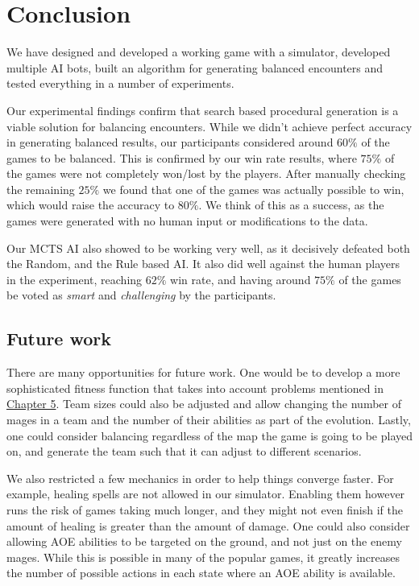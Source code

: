 \chapter{Conclusion}
\label{chapter06}

We have designed and developed a working game with a simulator, developed multiple
AI bots, built an algorithm for generating balanced encounters and tested everything
in a number of experiments.

Our experimental findings confirm that search based procedural generation
is a viable solution for balancing encounters. While we didn't achieve perfect
accuracy in generating balanced results, our participants considered around $60\%$
of the games to be balanced. This is confirmed by our win rate results, where $75\%$
of the games were not completely won/lost by the players. After manually checking the remaining
$25\%$ we found that one of the games was actually possible to win, which would raise the accuracy
to $80\%$. We think of this as a success, as the games were generated with no human input or modifications to the data.

Our MCTS AI also showed to be working very well, as it decisively defeated both the Random, and the Rule based AI.
It also did well against the human players in the experiment, reaching $62\%$ win rate, and having around $75\%$ of the
games be voted as \emph{smart} and \emph{challenging} by the participants.

\section{Future work}

There are many opportunities for future work. One would be to develop a more sophisticated fitness function that
takes into account problems mentioned in \hyperref[chapter05]{Chapter 5}. Team sizes could also be adjusted and allow changing the number of mages in a team and the number of their abilities as part of the evolution. Lastly, one could consider balancing regardless of the map the game is going to be played on, and generate the team such that it can adjust to different scenarios.

We also restricted a few mechanics in order to help things converge faster. For example, healing spells are not allowed in our simulator. Enabling them however runs the risk of games taking much longer, and they might not even finish if the amount of healing is greater than the amount of damage. One could also consider allowing AOE abilities to be targeted on the ground, and not just on the enemy mages. While this is possible in many of the popular games, it greatly increases the number of possible actions in each state where an AOE ability is available.